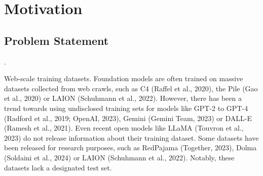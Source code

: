 
\section{Motivation}\label{motivation}

\subsection{Problem Statement}

.

Web-scale training datasets. Foundation models are often trained on massive datasets collected from web crawls, such as C4 (Raffel et al., 2020), the Pile (Gao et al., 2020) or LAION (Schuhmann et al., 2022). However, there has been a trend towards using undisclosed training sets for models like GPT-2 to GPT-4 (Radford et al., 2019; OpenAI, 2023), Gemini (Gemini Team, 2023) or DALL-E (Ramesh et al., 2021). Even recent open models like LLaMA (Touvron et al., 2023) do not release information about their training dataset. Some datasets have been released for research purposes, such as RedPajama (Together, 2023), Dolma (Soldaini et al., 2024) or LAION (Schuhmann et al., 2022). Notably, these datasets lack a designated test set.



